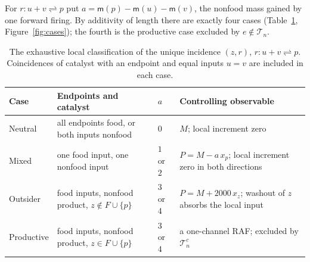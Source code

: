 \documentclass[11pt,letterpaper]{article}
\theoremstyle{plain}
\theoremstyle{definition}
\theoremstyle{remark}
\numberwithin{equation}{section}
\newcommand{\cT}{\mathcal T}
\newcommand{\m}{\mathsf m}
\begin{document}
For $r:u+v\rightleftharpoons p$ put $a=\m(p)-\m(u)-\m(v)$, the nonfood mass gained by one forward firing. By additivity of length there are exactly four cases (Table~\ref{tab:cases}, Figure~\ref{fig:cases}); the fourth is the productive case excluded by $e\notin\cT_n$.

\begin{table}[t]
\centering\small
\begin{tabular}{@{}l>{\raggedright\arraybackslash}p{.30\linewidth}l>{\raggedright\arraybackslash}p{.36\linewidth}@{}}
\toprule
Case & Endpoints and catalyst & $a$ & Controlling observable\\
\midrule
Neutral & all endpoints food, or both inputs nonfood & $0$ & $M$; local increment zero\\
Mixed & one food input, one nonfood input & $1$ or $2$ & $P=M-a\,x_p$; local increment zero in both directions\\
Outsider & food inputs, nonfood product, $z\notin F\cup\{p\}$ & $3$ or $4$ & $P=M+2000\,x_z$; washout of $z$ absorbs the local input\\
Productive & food inputs, nonfood product, $z\in F\cup\{p\}$ & $3$ or $4$ & a one-channel RAF; excluded by $\cT_n^c$\\
\bottomrule
\end{tabular}
\caption{The exhaustive local classification of the unique incidence $(z,r)$, $r:u+v\rightleftharpoons p$. Coincidences of catalyst with an endpoint and equal inputs $u=v$ are included in each case.}
\label{tab:cases}
\end{table}
\end{document}
